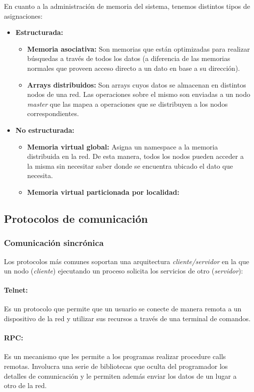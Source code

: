 En cuanto a la administración de memoria del sistema, tenemos	 distintos tipos de asignaciones:
\begin{itemize}
	\item \textbf{Estructurada:}
	\begin{itemize}
	\item \textbf{Memoria asociativa:} Son memorias que están optimizadas para realizar búsquedas a través de todos los datos (a diferencia de las memorias normales que proveen acceso directo a un dato en base a su dirección).
	\item\textbf{Arrays distribuidos:} Son arrays cuyos datos se almacenan en distintos nodos de una red. Las operaciones sobre el mismo son enviadas a un nodo \textit{master} que las mapea a operaciones que se distribuyen a los nodos correspondientes.
	\end{itemize}
	\item\textbf{No estructurada:}
	\begin{itemize}
		\item \textbf{Memoria virtual global:} Asigna un namespace a la memoria distribuida en la red. De esta manera, todos los nodos pueden acceder a la misma sin necesitar saber donde se encuentra ubicado el dato que necesita.
		\item\textbf{Memoria virtual particionada por localidad:} 
	\end{itemize}
\end{itemize}
\subsection{Protocolos de comunicación}
\subsubsection{Comunicación sincrónica}
Los protocolos más comunes soportan una arquitectura \textit{cliente/servidor} en la que un nodo (\textit{cliente}) ejecutando un proceso solicita los servicios de otro (\textit{servidor}):
\paragraph{Telnet:} Es un protocolo que permite que un usuario se conecte de manera remota a un dispositivo de la red y utilizar sus recursos a través de una terminal de comandos.
\paragraph{RPC:} Es un mecanismo que les permite a los programas realizar procedure calls remotas. Involucra una serie de bibliotecas que oculta del programador los detalles de comunicación y le permiten además enviar los datos de un lugar a otro de la red.

